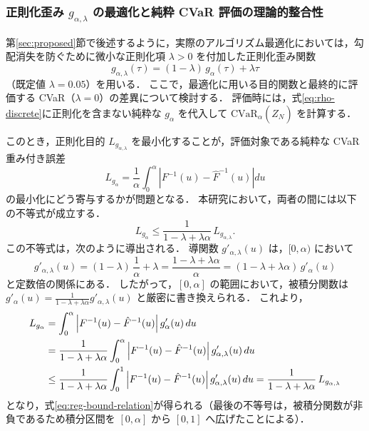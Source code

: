 \documentclass[a4paper,10pt]{jsarticle}
\theoremstyle{definition}
\newcommand{\CVaR}{\mathrm{CVaR}}
\renewcommand{\Finv}{F^{-1}}
\newcommand{\Fhinv}{\hat{F}^{-1}}
\begin{document}
\subsubsection{正則化歪み $g_{\alpha,\lambda}$ の最適化と純粋 CVaR 評価の理論的整合性}
第\ref{sec:proposed}節で後述するように，実際のアルゴリズム最適化においては，勾配消失を防ぐために微小な正則化項 $\lambda > 0$ を付加した正則化歪み関数
\begin{equation}
  g_{\alpha,\lambda}(\tau) = (1-\lambda)\,g_\alpha(\tau) + \lambda\tau
\end{equation}
（既定値 $\lambda=0.05$）を用いる．
ここで，最適化に用いる目的関数と最終的に評価する CVaR（$\lambda=0$）の差異について検討する．
評価時には，式\eqref{eq:rho-discrete}に正則化を含まない純粋な $g_\alpha$ を代入して $\CVaR_\alpha(\hat Z_N)$ を計算する．

このとき，正則化目的 $L_{g_{\alpha,\lambda}}$ を最小化することが，評価対象である純粋な CVaR 重み付き誤差
\begin{equation}
  L_{g_\alpha} = \frac{1}{\alpha}\int_0^\alpha \left|\Finv(u) - \Fhinv(u)\right|du
\end{equation}
の最小化にどう寄与するかが問題となる．
本研究において，両者の間には以下の不等式が成立する．
\begin{equation}
  L_{g_\alpha} \le \frac{1}{1-\lambda+\lambda\alpha}\,L_{g_{\alpha,\lambda}}.
  \label{eq:reg-bound-relation}
\end{equation}
この不等式は，次のように導出される．
導関数 $g'_{\alpha,\lambda}(u)$ は，$[0, \alpha)$ において
\begin{equation}
  g'_{\alpha,\lambda}(u) = (1-\lambda)\,\frac{1}{\alpha} + \lambda = \frac{1-\lambda+\lambda\alpha}{\alpha} = (1-\lambda+\lambda\alpha)\,g'_\alpha(u)
\end{equation}
と定数倍の関係にある．
したがって，$[0, \alpha]$ の範囲において，被積分関数は $g'_\alpha(u) = \frac{1}{1-\lambda+\lambda\alpha} g'_{\alpha,\lambda}(u)$ と厳密に書き換えられる．
これより，
\begin{align}
  L_{g_\alpha}
  &= \int_0^\alpha \left|\Finv(u) - \Fhinv(u)\right| g'_\alpha(u)\,du \notag\\
  &= \frac{1}{1-\lambda+\lambda\alpha}\int_0^\alpha \left|\Finv(u) - \Fhinv(u)\right| g'_{\alpha,\lambda}(u)\,du \notag\\
  &\le \frac{1}{1-\lambda+\lambda\alpha}\int_0^1 \left|\Finv(u) - \Fhinv(u)\right| g'_{\alpha,\lambda}(u)\,du = \frac{1}{1-\lambda+\lambda\alpha}\,L_{g_{\alpha,\lambda}}
\end{align}
となり，式\eqref{eq:reg-bound-relation}が得られる（最後の不等号は，被積分関数が非負であるため積分区間を $[0, \alpha]$ から $[0, 1]$ へ広げたことによる）．
\end{document}
